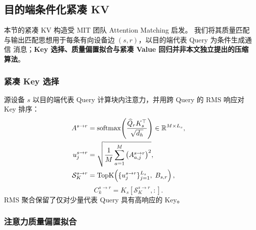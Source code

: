 \documentclass[sigconf,nonacm]{acmart}
\newcommand{\TopK}{\mathrm{TopK}}
\newcommand{\softmax}{\mathrm{softmax}}
\begin{document}
\subsection{目的端条件化紧凑 KV}

本节的紧凑 KV 构造受 MIT 团队 Attention Matching \cite{zweiger2026attentionmatching} 启发。
我们将其质量匹配与输出匹配思想用于每条有向设备边 $(s,r)$，以目的端代表 Query 为条件生成通信
消息；\textbf{Key 选择、质量偏置拟合与紧凑 Value 回归并非本文独立提出的压缩算法}。

\subsubsection{紧凑 Key 选择}

源设备 $s$ 以目的端代表 Query 计算块内注意力，并用跨 Query 的 RMS 响应对 Key 排序：
\begin{align}
A^{s \to r} &= \softmax\!\left(\frac{\widehat{Q}_r K_s^\top}{\sqrt{d_h}}\right) \in \mathbb{R}^{M \times L_s},\notag\\
u_j^{s \to r} &= \sqrt{\frac{1}{M}\sum_{a=1}^{M}\left(A_{a,j}^{s \to r}\right)^2},\notag\\
\mathcal{S}_K^{s \to r} &= \TopK\!\left(\{u_j^{s \to r}\}_{j=1}^{L_s},\; B_{s,r}\right),
\label{eq:key-select}
\end{align}
\begin{equation}
C_k^{s \to r} = K_s\!\left[\mathcal{S}_K^{s \to r}, :\right].
\label{eq:ck}
\end{equation}
RMS 聚合保留了仅对少量代表 Query 具有高响应的 Key。

\subsubsection{注意力质量偏置拟合}
\end{document}
